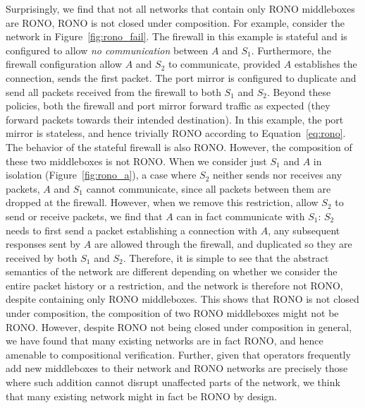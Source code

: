 \cbstart
Surprisingly, we find that not all networks that contain only RONO middleboxes are RONO, \ie RONO is not closed under composition. For example, consider the network in Figure~\ref{fig:rono_fail}. The firewall in this example is stateful and is configured to allow \emph{no communication} between $A$ and $S_1$. Furthermore, the firewall configuration allow $A$ and $S_2$ to communicate, provided $A$ establishes the connection, \ie sends the first packet. The port mirror is configured to duplicate and send all packets received from the firewall to both $S_1$ and $S_2$. Beyond these policies, both the firewall and port mirror forward traffic as expected (\ie they forward packets towards their intended destination). In this example, the port mirror is stateless, and hence trivially RONO according to Equation~\ref{eq:rono}. The behavior of the stateful firewall is also RONO. However, the composition of these two middleboxes is not RONO. When we consider just $S_1$ and $A$ in isolation (Figure~\ref{fig:rono_a}), \ie a case where $S_2$ neither sends nor receives any packets, $A$ and $S_1$ cannot communicate, since all packets between them are dropped at the firewall. However, when we remove this restriction, \ie allow $S_2$ to send or receive packets, we find that $A$ can in fact communicate with $S_1$: $S_2$ needs to first send a packet establishing a connection with $A$, any subsequent responses sent by $A$ are allowed through the firewall, and duplicated so they are received by both $S_1$ and $S_2$. Therefore, it is simple to see that the abstract semantics of the network are different depending on whether we consider the entire packet history or a restriction, and the network is therefore not RONO, despite containing only RONO middleboxes. This shows that RONO is not closed under composition, \ie the composition of two RONO middleboxes might not be RONO. However, despite RONO not being closed under composition in general, we have found that many existing networks are in fact RONO, and hence amenable to compositional verification. Further, given that operators frequently add new middleboxes to their network and RONO networks are precisely those where such addition cannot disrupt unaffected parts of the network, we think that many existing network might in fact be RONO by design.
\cbend